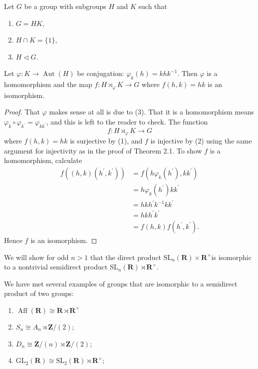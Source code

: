 \begin{theorem}[Theorem 4.1]
Let $G$ be a group with subgroups $H$ and $K$ such that
	\begin{enumerate}
		\item $G=H K$,
		\item $H \cap K=\{1\}$,
		\item $H \lhd G$.
	\end{enumerate}
Let $\varphi: K \rightarrow \operatorname{Aut}(H)$ be conjugation: $\varphi_k(h)=k h k^{-1}$. Then $\varphi$ is a homomorphism and the map $f: H \rtimes_{\varphi} K \rightarrow G$ where $f(h, k)=h k$ is an isomorphism.
\end{theorem}
\begin{proof}
That $\varphi$ makes sense at all is due to (3). That it is a homomorphism means $\varphi_k \circ \varphi_{k^{\prime}}=\varphi_{k k^{\prime}}$, and this is left to the reader to check. The function
\[
f: H \rtimes_{\varphi} K \rightarrow G
\]
where $f(h, k)=h k$ is surjective by (1), and $f$ is injective by (2) using the same argument for injectivity as in the proof of Theorem 2.1. To show $f$ is a homomorphism, calculate
\[
\begin{aligned}
f\left((h, k)\left(h^{\prime}, k^{\prime}\right)\right) & =f\left(h \varphi_k\left(h^{\prime}\right), k k^{\prime}\right) \\
& =h \varphi_k\left(h^{\prime}\right) k k^{\prime} \\
& =h k h^{\prime} k^{-1} k k^{\prime} \\
& =h k h^{\prime} k^{\prime} \\
& =f(h, k) f\left(h^{\prime}, k^{\prime}\right) .
\end{aligned}
\]
Hence $f$ is an isomorphism.
\end{proof}

\begin{example}
We will show for odd $n>1$ that the direct product $\mathrm{SL}_n(\mathbf{R}) \times \mathbf{R}^{\times}$is isomorphic to a nontrivial semidirect product $\mathrm{SL}_n(\mathbf{R}) \rtimes \mathbf{R}^{\times}$.
\end{example}
We have met several examples of groups that are isomorphic to a semidirect product of two groups:

\begin{enumerate}
	\item $\operatorname{Aff}(\mathbf{R}) \cong \mathbf{R} \rtimes \mathbf{R}^{\times}$
	\item $S_n \cong A_n \rtimes \mathbf{Z} /(2)$;
	\item $D_n \cong \mathbf{Z} /(n) \rtimes \mathbf{Z} /(2)$;
	\item $\mathrm{GL}_2(\mathbf{R}) \cong \mathrm{SL}_2(\mathbf{R}) \rtimes \mathbf{R}^{\times}$;
\end{enumerate}

